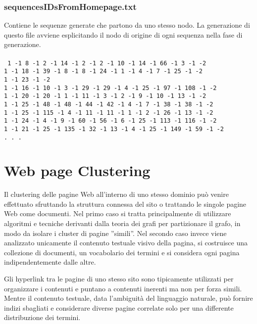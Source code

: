 \subsubsection{sequencesIDsFromHomepage.txt}
Contiene le sequenze generate che partono da uno stesso nodo. La generazione di questo file avviene esplicitando il nodo di origine di ogni sequenza nella fase di generazione.
\\\\
\texttt{
1 -1 8 -1 2 -1 14 -1 2 -1 2 -1 10 -1 14 -1 66 -1 3 -1 -2\\
1 -1 18 -1 39 -1 8 -1 8 -1 24 -1 1 -1 4 -1 7 -1 25 -1 -2\\
1 -1 23 -1 -2\\
1 -1 16 -1 10 -1 3 -1 29 -1 29 -1 4 -1 25 -1 97 -1 108 -1 -2\\
1 -1 20 -1 20 -1 1 -1 11 -1 3 -1 2 -1 9 -1 10 -1 13 -1 -2\\
1 -1 25 -1 48 -1 48 -1 44 -1 42 -1 4 -1 7 -1 38 -1 38 -1 -2\\
1 -1 25 -1 115 -1 4 -1 11 -1 11 -1 1 -1 2 -1 26 -1 13 -1 -2\\
1 -1 24 -1 4 -1 9 -1 60 -1 56 -1 6 -1 25 -1 113 -1 116 -1 -2\\
1 -1 21 -1 25 -1 135 -1 32 -1 13 -1 4 -1 25 -1 149 -1 59 -1 -2\\
. . .\\
}


\section{Web page Clustering}
Il clustering delle pagine Web all'interno di uno stesso dominio può venire effettuato sfruttando la struttura connessa del sito o trattando le singole pagine Web come documenti. Nel primo caso si tratta principalmente di utilizzare algoritmi e tecniche derivanti dalla teoria dei grafi per partizionare il grafo, in modo da isolare i cluster di pagine ''simili''. Nel secondo caso invece viene analizzato unicamente il contenuto testuale visivo della pagina, si costruisce una collezione di documenti, un vocabolario dei termini e si considera ogni pagina indipendentemente dalle altre.

Gli hyperlink tra le pagine di uno stesso sito sono tipicamente utilizzati per organizzare i contenuti e puntano a contenuti inerenti ma non per forza simili. Mentre il contenuto testuale, data l'ambiguità del linguaggio naturale, può fornire indizi sbagliati e considerare diverse pagine correlate solo per una differente distribuzione dei termini.

